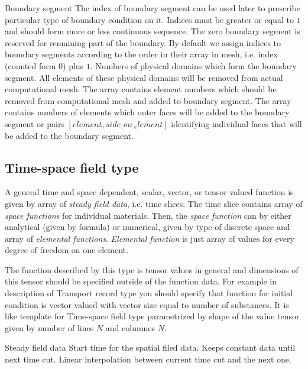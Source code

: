 \documentclass[12pt,a4paper]{report}
\begin{document}
\begin{recordtype}{Boundary segment}{}
 The index of boundary segment can be used later to prescribe particular type of boundary condition on it.
 Indices must be greater or equal to $1$ and should form more or less continuous sequence. The zero boundary segment is reserved for remaining part
 of the boundary. By default we assign indices to boundary segments according to the order in their array in mesh, i.e. index (counted form $0$) plus $1$.
 Numbers of physical domains which form the boundary segment. All elements of these physical domains will be removed from actual computational mesh.
 The array contains element numbers which should be removed from computational mesh and added to boundary segment.
 The array contains numbers of elements which outer faces will be added to the boundary segment or pairs $[element, side\_on\   _element]$ 
 identifying individual faces that will be added to the boundary segment.
\end{recordtype}

\subsection{Time-space field type}
A general time and space dependent, scalar, vector, or  tensor valued function is given by array
of {\it steady field data}, i.e. time slices. The time slice contains array of {\it space functions}
for individual materials. Then, the {\it space function} can by either analytical (given by formula)
or numerical, given by type of discrete space and array of {\it elemental functions}. {\it Elemental function} is
just array of values for every degree of freedom on one element.

The function described by this type is tensor values in general and dimensions of this tensor should be 
specified outside of the function data. For example in description of Transport record type you should specify that function
for initial condition is vector valued with vector size equal to number of substances. It is like template for Time-space field
type parametrized by shape of the value tensor given by number of lines $N$ and columnes $N$.


\begin{recordtype}{Steady field data}{}
  Start time for the spatial filed data. 
   Keeps constant data until next time cut.
   Linear interpolation between current time cut and the next one.
\end{recordtype}
\end{document}
